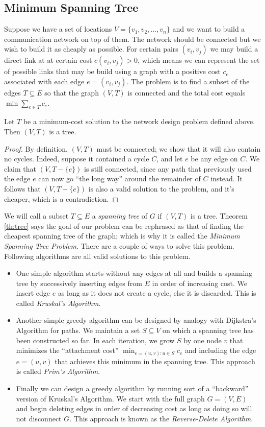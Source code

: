 \documentclass[]{article}
\begin{document}
	\subsection{Minimum Spanning Tree}
		Suppose we have a set of locations $V = \{v_1, v_2, \dots, v_n\}$ and we want to build a communication network on top of them. The network should be connected but we wish to build it as cheaply as possible. For certain pairs $(v_i,v_j)$ we may build a direct link at at certain cost $c(v_i,v_j) > 0$, which means we can represent the set of possible links that may be build using a graph with a positive cost $c_e$ associated with each edge $e = (v_i,v_j)$. The problem is to find a subset of the edges $T \subseteq E$ so that the graph $(V,T)$ is connected and the total cost equals $\min\sum_{e\in T}c_e$. 
		\begin{theorem} \label{th:tree} Let $T$ be a minimum-cost solution to the network design problem defined above. Then $(V,T)$ is a tree.\end{theorem}
		\begin{proof}
			By definition, $(V,T)$ must be connected; we show that it will also contain no cycles. Indeed, suppose it contained a cycle $C$, and let $e$ be any edge on $C$. We claim that $(V,T-\{e\})$ is still connected, since any path that previously used the edge $e$ can now go ``the long way'' around the remainder of $C$ instead. It follows that $(V,T-\{e\})$ is also a valid solution to the problem, and it's cheaper, which is a contradiction.
		\end{proof}
		We will call a subset $T \subseteq E$ a \emph{spanning tree} of $G$ if $(V,T)$ is a tree. Theorem \ref{th:tree} says the goal of our problem can be rephrased as that of finding the cheapest spanning tree of the graph; which is why it is called the \emph{Minimum Spanning Tree Problem}. There are a couple of ways to solve this problem. Following algorithms are all valid solutions to this problem.
		\begin{itemize}
			\item One simple algorithm starts without any edges at all and builds a spanning tree by successively inserting edges from $E$ in order of increasing cost. We insert edge $e$ as long as it does not create a cycle, else it is discarded. This is called \emph{Kruskal's Algorithm}.
			\item Another simple greedy algorithm can be designed by analogy with Dijkstra's Algorithm for paths. We maintain a set $S \subseteq V$ on which a spanning tree has been constructed so far. In each iteration, we grow $S$ by one node $v$ that minimizes the ``attachment cost'' $\min_{e=(u,v):u\in S}c_e$ and including the edge $e = (u,v)$ that achieves this minimum in the spanning tree. This approach is called \emph{Prim's Algorithm}.
			\item Finally we can design a greedy algorithm by running sort of a ``backward'' version of Kruskal's Algorithm. We start with the full graph $G = (V,E)$ and begin deleting edges in order of decreasing cost as long as doing so will not disconnect $G$. This approach is known as the \emph{Reverse-Delete Algorithm}.
		\end{itemize}
\end{document}
